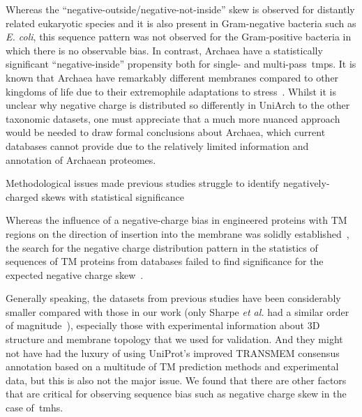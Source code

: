 Whereas the ``negative-outside/negative-not-inside'' skew is observed for distantly related eukaryotic species and it is also present in Gram-negative bacteria such as \textit{E.
coli}, this sequence pattern was not observed for the Gram-positive bacteria in which there is no observable bias.
In contrast, Archaea have a statistically significant ``negative-inside'' propensity both for single- and multi\--pass~\gls{tmp}s.
It is known that Archaea have remarkably different membranes compared to other kingdoms of life due to their extremophile adaptations to stress~\cite{Oger2013}.
Whilst it is unclear why negative charge is distributed so differently in UniArch to the other taxonomic datasets, one must appreciate that a much more nuanced approach would be needed to draw formal conclusions about Archaea, which current databases cannot provide due to the relatively limited information and annotation of Archaean proteomes.

Methodological issues made previous studies struggle to identify negatively\--charged skews with statistical significance

Whereas the influence of a negative\--charge bias in engineered proteins with TM regions on the direction of insertion into the membrane was solidly established~\cite{Nilsson1990, Andersson1993, Kim1994, Andersson1992, Rutz1999}, the search for the negative charge distribution pattern in the statistics of sequences of TM proteins from databases failed to find significance for the expected negative charge skew~\cite{Sharpe2010, Baeza-Delgado2013, Granseth2005, Pogozheva2013, Nilsson2005a, Andersson1992}.

Generally speaking, the datasets from previous studies have been considerably smaller compared with those in our work (only Sharpe \textit{et al.} had a similar order of magnitude~\cite{Sharpe2010}), especially those with experimental information about 3D structure and membrane topology that we used for validation.
And they might not have had the luxury of using UniProt’s improved TRANSMEM consensus annotation based on a multitude of TM prediction methods and experimental data, but this is also not the major issue.
We found that there are other factors that are critical for observing sequence bias such as negative charge skew in the case of~\gls{tmh}s.

